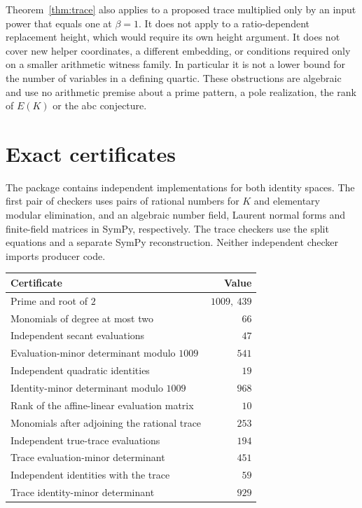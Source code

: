 \documentclass[11pt,a4paper]{article}
\begin{document}
Theorem~\ref{thm:trace} also applies to a proposed trace multiplied
only by an input power that equals one at $\beta=1$. It does not
apply to a ratio-dependent replacement height, which would require
its own height argument. It does not cover new helper coordinates,
a different embedding, or conditions required only on a smaller
arithmetic witness family. In particular it is not a lower bound
for the number of variables in a defining quartic. These obstructions
are algebraic and use no arithmetic premise about a prime pattern,
a pole realization, the rank of $E(K)$ or the abc conjecture.

\section{Exact certificates}\label{sec:certificates}
The package
contains independent implementations for both identity spaces. The first
pair of checkers uses pairs of
rational numbers for $K$ and elementary modular elimination, and
an algebraic number field, Laurent normal forms and
finite-field matrices in SymPy, respectively. The trace checkers use
the split equations and a separate SymPy reconstruction. Neither
independent checker imports producer code.

\begin{center}
\begin{tabular}{lr}
\toprule
Certificate & Value\\
\midrule
Prime and root of $2$ & $1009,\ 439$\\
Monomials of degree at most two & $66$\\
Independent secant evaluations & $47$\\
Evaluation-minor determinant modulo $1009$ & $541$\\
Independent quadratic identities & $19$\\
Identity-minor determinant modulo $1009$ & $968$\\
Rank of the affine-linear evaluation matrix & $10$\\
\midrule
Monomials after adjoining the rational trace & $253$\\
Independent true-trace evaluations & $194$\\
Trace evaluation-minor determinant & $451$\\
Independent identities with the trace & $59$\\
Trace identity-minor determinant & $929$\\
\bottomrule
\end{tabular}
\end{center}
\end{document}
